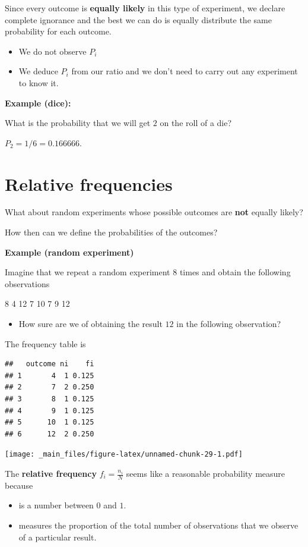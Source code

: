 \documentclass[
]{book}
\providecommand{\tightlist}{%
  \setlength{\itemsep}{0pt}\setlength{\parskip}{0pt}}
\begin{document}
Since every outcome is \textbf{equally likely} in this type of experiment, we declare complete ignorance and the best we can do is equally distribute the same probability for each outcome.

\begin{itemize}
\tightlist
\item
  We do not observe \(P_i\)
\item
  We deduce \(P_i\) from our ratio and we don't need to carry out any experiment to know it.
\end{itemize}

\textbf{Example (dice):}

What is the probability that we will get \(2\) on the roll of a die?

\(P_2=1/6=0.166666\).

\hypertarget{relative-frequencies-1}{%
\section{Relative frequencies}\label{relative-frequencies-1}}

What about random experiments whose possible outcomes are \textbf{not} equally likely?

How then can we define the probabilities of the outcomes?

\textbf{Example (random experiment)}

Imagine that we repeat a random experiment \(8\) times and obtain the following observations

8 4 12 7 10 7 9 12

\begin{itemize}
\tightlist
\item
  How sure are we of obtaining the result \(12\) in the following observation?
\end{itemize}

The frequency table is

\begin{verbatim}
##   outcome ni    fi
## 1       4  1 0.125
## 2       7  2 0.250
## 3       8  1 0.125
## 4       9  1 0.125
## 5      10  1 0.125
## 6      12  2 0.250
\end{verbatim}

\texttt{[image: \_main\_files/figure-latex/unnamed-chunk-29-1.pdf]}

The \textbf{relative frequency} \(f_i =\frac{ n_ i }{ N}\) seems like a reasonable probability measure because

\begin{itemize}
\tightlist
\item
  is a number between \(0\) and \(1\).
\item
  measures the proportion of the total number of observations that we observe of a particular result.
\end{itemize}
\end{document}

